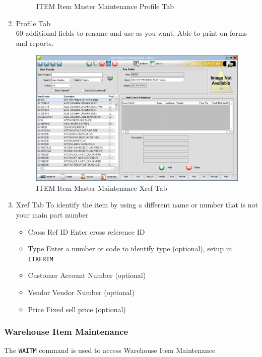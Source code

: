 \begin{enumerate}
\begin{figure}[H]
		\caption{ITEM Item Master Maintenance Profile Tab}
	\end{figure}
	\item Profile Tab\\
	60 additional fields to rename and use as you want. Able to print on forms and reports.
	\begin{figure}[H]
		\includegraphics[width=\textwidth]{../img/image61}
		\caption{ITEM Item Master Maintenance Xref Tab}
	\end{figure}
	\item Xref Tab \textemdash To identify the item by using a different name or number that is not your main part number
	\begin{itemize}
		\item Cross Ref ID \textemdash Enter cross reference ID
		\item Type \textemdash Enter a number or code to identify type (optional), setup in \texttt{ITXFRTM}
		\item Customer \textemdash Account Number (optional)
		\item Vendor \textemdash Vendor Number (optional)
		\item Price \textemdash Fixed sell price (optional)
	\end{itemize}
\end{enumerate}

\subsubsection{Warehouse Item Maintenance}


The \texttt{WAITM} command is used to access Warehouse Item Maintenance

